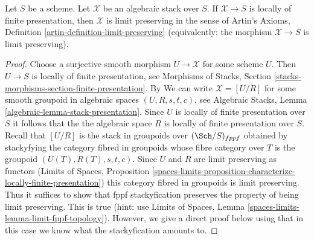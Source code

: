 \begin{lemma}
\label{lemma-locally-finite-presentation-limit-preserving}
Let $S$ be a scheme. Let $\mathcal{X}$ be an algebraic stack
over $S$. If $\mathcal{X} \to S$ is locally of finite presentation,
then $\mathcal{X}$ is limit preserving in the sense of
Artin's Axioms, Definition \ref{artin-definition-limit-preserving}
(equivalently: the morphism $\mathcal{X} \to S$ is limit preserving).
\end{lemma}

\begin{proof}
Choose a surjective smooth morphism $U \to \mathcal{X}$ for some scheme $U$.
Then $U \to S$ is locally of finite presentation, see
Morphisms of Stacks, Section
\ref{stacks-morphisms-section-finite-presentation}.
By
We can write $\mathcal{X} = [U/R]$ for some smooth groupoid in
algebraic spaces $(U, R, s, t, c)$, see
Algebraic Stacks, Lemma \ref{algebraic-lemma-stack-presentation}.
Since $U$ is locally of finite presentation over $S$
it follows that the the algebraic space $R$ is
locally of finite presentation over $S$.
Recall that $[U/R]$ is the stack in groupoids over $(\Sch/S)_{fppf}$
obtained by stackyfying the category fibred in groupoids
whose fibre category over $T$ is the groupoid $(U(T), R(T), s, t, c)$.
Since $U$ and $R$ are limit preserving as functors
(Limits of Spaces, Proposition
\ref{spaces-limits-proposition-characterize-locally-finite-presentation})
this category fibred in groupoids is limit preserving.
Thus it suffices to show that fppf stackyfication preserves
the property of being limit preserving. This is true
(hint: use Limits of Spaces, Lemma
\ref{spaces-limits-lemma-limit-fppf-topology}).
However, we give a direct proof below using that in this
case we know what the stackyfication amounts to.


\end{proof}
